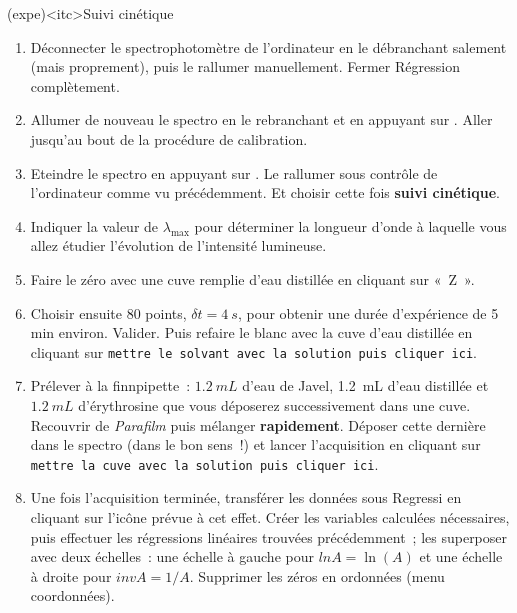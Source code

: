 \documentclass[../main/main.tex]{subfiles}
\begin{document}
\begin{tcb}[breakable](expe)<itc>{Suivi cinétique}
	\begin{enumerate}
		\item Déconnecter le spectrophotomètre de l'ordinateur en le débranchant
		      salement (mais proprement), puis le rallumer manuellement. Fermer
		      Régression complètement.
		\item Allumer de nouveau le spectro en le rebranchant et en appuyant sur
		      . Aller jusqu'au bout de la procédure de calibration.
		\item Eteindre le spectro en appuyant sur . Le rallumer sous
		      contrôle de l'ordinateur comme vu précédemment. Et choisir cette fois
		      \textbf{suivi cinétique}.
		\item Indiquer la valeur de $\lambda_{\max}$ pour déterminer la longueur
		      d'onde à laquelle vous allez étudier l'évolution de l'intensité
		      lumineuse.
		\item Faire le zéro avec une cuve remplie d'eau distillée en cliquant sur
		      «~Z~».
		\item Choisir ensuite 80 points, $\delta t=\SI{4}{s}$, pour obtenir une durée
		      d'expérience de 5 min environ. Valider. Puis refaire le blanc avec la
		      cuve d'eau distillée en cliquant sur \texttt{mettre le solvant avec la
			      solution puis cliquer ici}.
		\item Prélever à la finnpipette~: $\SI{1,2}{mL}$ d'eau de Javel,
		      \SI{1.2}{mL} d'eau distillée et $\SI{1,2}{mL}$ d'érythrosine que vous
		      déposerez successivement dans une cuve. Recouvrir de \textit{Parafilm}
		      puis mélanger \textbf{rapidement}. Déposer cette dernière dans le spectro
		      (dans le bon sens~!) et lancer l'acquisition en cliquant sur
		      \texttt{mettre la cuve avec la solution puis cliquer ici}.
		\item Une fois l'acquisition terminée, transférer les données sous Regressi en
		      cliquant sur l'icône prévue à cet effet. Créer les variables calculées
		      nécessaires, puis effectuer les régressions linéaires trouvées précédemment~;
		      les superposer avec deux échelles~: une échelle à gauche pour $lnA = \ln(A)$
		      et une échelle à droite pour $invA = 1 / A$. Supprimer les zéros en ordonnées
		      (menu coordonnées).
	\end{enumerate}
\end{tcb}
\end{document}
